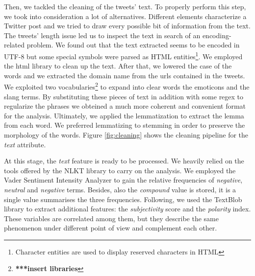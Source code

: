 \documentclass[conference]{IEEEtran}
\begin{document}
Then, we tackled the cleaning of the tweets' text. To properly perform this step, we took into consideration a lot of alternatives. Different elements characterize a Twitter post and we tried to draw every possible bit of information from the text. The tweets' length issue led us to inspect the text in search of an encoding-related problem. We found out that the text extracted seems to be encoded in UTF-8\cite{utf8} but some special symbols were parsed as HTML entities\footnote{Character entities are used to display reserved characters in HTML}. We employed the html library to clean up the text. After that, we lowered the case of the words and we extracted the domain name from the urls contained in the tweets. We exploited two vocabularies\footnote{\textbf{***insert libraries}} to expand into clear words the emoticons and the slang terms. By substituting these pieces of text in addition with some regex to regularize the phrases we obteined a much more coherent and convenient format for the analysis. Ultimately, we applied the lemmatization\cite{lemmatization} to extract the lemma from each word. We preferred lemmatizing to stemming\cite{stemming} in order to preserve the morphology of the words\cite{stemmingVSlemmatizing}.
Figure \ref{fig:cleaning} shows the cleaning pipeline for the \textit{text} attribute.

At this stage, the \textit{text} feature is ready to be processed. We heavily relied on the tools offered by the NLKT library\cite{nlkt} to carry on the analysis. We employed the Vader Sentiment Intensity Analyzer\cite{vader} to gain the relative frequencies of \textit{negative}, \textit{neutral} and \textit{negative} terms. Besides, also the \textit{compound} value is stored, it is a single value summarises the three frequencies. Following, we used the TextBlob library\cite{textblob} to extract additional features: the \textit{subjectivity} score and the \textit{polarity} index. These variables are correlated among them, but they describe the same phenomenon under different point of view and complement each other.
\end{document}
